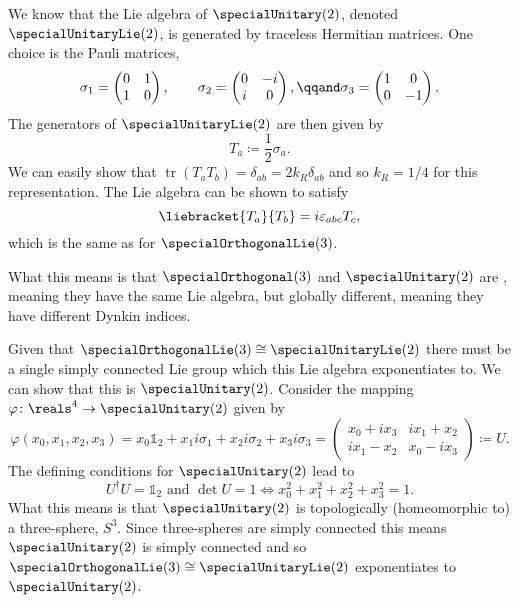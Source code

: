 \documentclass[fleqn]{NotesClass}
\newcommand*{\isomorphic}{\cong}
\newcommand*{\hermit}{\dagger}
\newcommand*{\ident}{\mathbb{1}}
\DeclareMathOperator{\tr}{tr}
\begin{document}
    We know that the Lie algebra of \(\specialUnitary(2)\), denoted \(\specialUnitaryLie(2)\), is generated by traceless Hermitian matrices.
    One choice is the Pauli matrices,
    \begin{equation}
        \sigma_1 = 
        \begin{pmatrix}
            0 & 1\\
            1 & 0
        \end{pmatrix}
        , \qquad \sigma_2 = 
        \begin{pmatrix}
            0 & -i\\
            i & 0
        \end{pmatrix}
        , \qqand \sigma_3 = 
        \begin{pmatrix}
            1 & 0\\
            0 & -1
        \end{pmatrix}
        .
    \end{equation}
    The generators of \(\specialUnitaryLie(2)\) are then given by
    \begin{equation}
        T_a \coloneqq \frac{1}{2}\sigma_a.
    \end{equation}
    We can easily show that \(\tr(T_aT_b) = \delta_{ab} = 2k_R\delta_{ab}\) and so \(k_R = 1/4\) for this representation.
    The Lie algebra can be shown to satisfy
    \begin{equation}
        \liebracket{T_a}{T_b} = i\varepsilon_{abc}T_c,
    \end{equation}
    which is the same as for \(\specialOrthogonalLie(3)\).
    
    What this means is that \(\specialOrthogonal(3)\) and \(\specialUnitary(2)\) are , meaning they have the same Lie algebra, but globally different, meaning they have different Dynkin indices.
    
    Given that \(\specialOrthogonalLie(3) \isomorphic \specialUnitaryLie(2)\) there must be a single simply connected Lie group which this Lie algebra exponentiates to.
    We can show that this is \(\specialUnitary(2)\).
    Consider the mapping \(\varphi \colon \reals^4 \to \specialUnitary(2)\) given by
    \begin{equation}
        \varphi(x_0, x_1, x_2, x_3) = x_0\ident_2 + x_1 i\sigma_1 + x_2 i\sigma_2 + x_3 i\sigma_3 = 
        \begin{pmatrix}
            x_0 + ix_3 & ix_1 + x_2\\
            ix_1 - x_2 & x_0 - ix_3
        \end{pmatrix}
        \coloneqq U.
    \end{equation}
    The defining conditions for \(\specialUnitary(2)\) lead to
    \begin{equation}
        U^\hermit U = \ident_2 \text{ and } \det U = 1 \iff x_0^2 + x_1^2 + x_2^2 + x_3^2 = 1.
    \end{equation}
    What this means is that \(\specialUnitary(2)\) is topologically (homeomorphic to) a three-sphere, \(S^3\).
    Since three-spheres are simply connected this means \(\specialUnitary(2)\) is simply connected and so \(\specialOrthogonalLie(3) \isomorphic \specialUnitaryLie(2)\) exponentiates to \(\specialUnitary(2)\).
    
\end{document}
